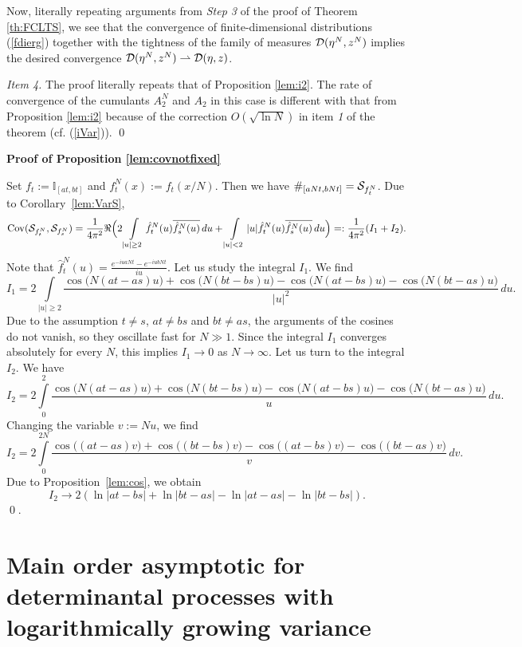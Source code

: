 \documentclass{article}
\numberwithin{equation}{section}
\newcommand{\mI}{\mathbb{I}}
\newcommand{\DD}{{\cal D}}
\newcommand{\SSS}{{\cal S}}
\newcommand{\Cov}{\operatorname{Cov}}
\newcommand{\ov}{\overline}
\newcommand{\ssk}{\smallskip}
\newcommand{\msk}{\medskip}
\newcommand{\ds}{\displaystyle{}}
\newcommand{\raw}{\rightharpoonup}
\newcommand{\fr}{\frac}
\newcommand{\ili}{\int\limits}
\newcommand{\lbl}{\label}
\newcommand{\rprop}{Proposition \nolinebreak}
\newcommand{\rtheo}{Theorem \nolinebreak}
\newcommand{\sq}{\sqrt}
\begin{document}
Now, literally repeating arguments from {\it Step 3} of the proof of \rtheo\ref{th:FCLTS},
we see that the convergence of finite-dimensional distributions (\ref{fdierg})
together with the tightness of the family of measures
$\DD(\eta^N,z^N)$ implies the desired convergence
$\DD(\eta^N,z^N)\raw \DD(\eta,z)$.

\ssk
{\it Item 4.}
The proof literally repeats that of \rprop \ref{lem:i2}. The rate of convergence of the cumulants $A^N_2$ and $A_2$
in this case is different with that from \rprop \ref{lem:i2} because of the correction $O(\sq{\ln N})$ in item {\it 1} of the theorem (cf. (\ref{iVar})).
\qed

\msk

{\bf Proof of Proposition \ref{lem:covnotfixed}}

Set $f_t:=\mI_{[at,bt]}$ and $f^N_t(x):=f_t(x/N)$. 
Then we have 
$\#_{[aNt,bNt]}=\SSS_{f^N_t}$. 
Due to Corollary~\ref{lem:VarS},
$$
\Cov(\SSS_{f^N_t},\SSS_{f^N_s})=
\fr{1}{4\pi^2}
\Re\Big(
2\ili_{|u|\geq 2} \hat f^N_t(u)\ov{\hat f^N_s(u)}\,du
+ \ili_{|u|<2} |u| \hat f^N_t(u)\ov{\hat f^N_s(u)}\,du
\Big)=:\fr{1}{4\pi^2}(I_1+I_2).
$$
Note that $\ds{\hat f^N_t(u)=\fr{e^{-iuaNt}-e^{-iubNt}}{iu}}$.
Let us study the integral $I_1$. We find
$$
I_1=2\ili_{|u|\geq 2}\frac{\cos\big(N(at-as)u\big) + \cos\big(N(bt-bs)u\big) - \cos\big(N(at-bs)u\big) -\cos\big(N(bt-as)u\big)}{|u|^2}\,du.
$$
Due to the assumption $t\neq s$, $at\neq bs$ and $bt\neq as$, the arguments of the cosines do not vanish, so they oscillate fast for $N\gg 1$. Since the integral $I_1$ converges absolutely for every $N$, this implies $I_1\to 0$ as $N\to\infty$.
Let us turn to the integral $I_2$. We have
$$
I_2=2\ili_0^2\frac{\cos\big(N(at-as)u\big) + \cos\big(N(bt-bs)u\big) - \cos\big(N(at-bs)u\big) -\cos\big(N(bt-as)u\big)}{u}\,du.
$$
Changing the variable $v:=Nu$, we find
$$
I_2=2\ili_0^{2N}\frac{\cos\big((at-as)v\big) + \cos\big((bt-bs)v\big) - \cos\big((at-bs)v\big) -\cos\big((bt-as)v\big)}{v}\,dv.
$$
Due to Proposition~\ref{lem:cos}, we obtain
$$
I_2\to 2(\ln|at-bs| + \ln|bt-as| -\ln|at-as|-\ln|bt-bs|).
$$
\qed.

%
%
%
%
%
%
%
%
%
%
\section{Main order asymptotic for  determinantal processes with logarithmically growing variance}
\lbl{sec:FCLTw}

\end{document}
